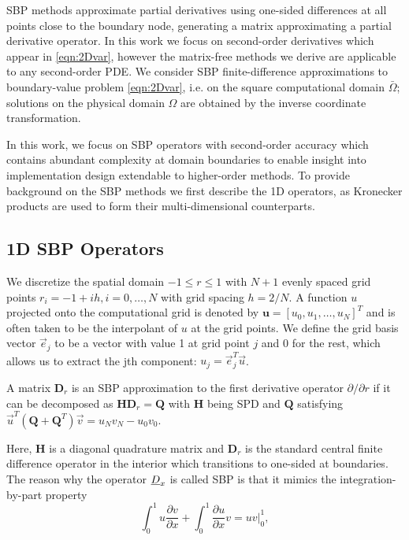 SBP methods approximate partial derivatives using one-sided differences at all points close to the boundary node, generating a matrix approximating a partial derivative operator. In this work we focus on second-order derivatives which appear in \eqref{eqn:2Dvar}, however the matrix-free methods we derive are applicable to any second-order PDE. We consider SBP finite-difference approximations to boundary-value problem \eqref{eqn:2Dvar}, i.e. on the square computational domain $\bar\Omega$; solutions on the physical domain $\Omega$ are obtained by the inverse coordinate transformation.

In this work, we focus on SBP operators with second-order accuracy which contains abundant complexity at domain boundaries to enable insight into implementation design extendable to higher-order methods.  To provide background on the SBP methods we first describe the 1D operators, as Kronecker products are used to form their multi-dimensional counterparts. 


\subsection{1D SBP Operators}

We discretize the spatial domain $-1\leq r \leq 1$ with $N+1$ evenly spaced grid points $r_i = -1 + ih, i=0, \dots, N$ with grid spacing $h = 2/N$. A function $u$ projected onto the computational grid is denoted by $\boldsymbol{u} = [u_0, u_1, \dots, u_N]^T$ and is often taken to be the interpolant of $u$ at the grid points. We define the grid basis vector $\vec{e}_j$ to be a vector with value 1 at grid point $j$ and 0 for the rest, which allows us to extract the jth component: $u_j = \vec{e}_j^T\vec{u}$.  

\begin{definition}
  A matrix $\boldsymbol{D}_{r}$ is an SBP approximation to the first derivative operator $\partial /\partial
  r$ if it can be decomposed as $\boldsymbol{H}\boldsymbol{D}_{r} = \boldsymbol{Q}$ with $\boldsymbol{H}$ being SPD and $\boldsymbol{Q}$ satisfying $\vec{u}^{T}(\boldsymbol{Q} +
  \boldsymbol{Q}^{T})\vec{v} = u_{N}v_{N} - u_{0}v_{0}$.
\end{definition}
%
\noindent Here, $\boldsymbol{H}$ is a diagonal quadrature matrix and  $\boldsymbol{D}_{r}$ is the standard central finite difference operator in the interior which transitions to one-sided at boundaries.
The reason why the operator $\emph{D}_x$ is called SBP is that it mimics the integration-by-part property 
\begin{equation}
  \int_0^1 u \frac{\partial v}{\partial x} + \int_0^1 \frac{\partial u}{\partial x} v = uv\bigg|_0^1,
  \label{eqn:1d_ibp}
\end{equation}

